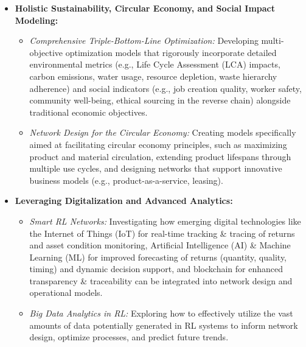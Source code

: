 \begin{itemize}
    \item \textbf{Holistic Sustainability, Circular Economy, and Social Impact Modeling:}
        \begin{itemize}
            \item \textit{Comprehensive Triple-Bottom-Line Optimization:} Developing multi-objective optimization models that rigorously incorporate detailed environmental metrics (e.g., Life Cycle Assessment (LCA) impacts, carbon emissions, water usage, resource depletion, waste hierarchy adherence) and social indicators (e.g., job creation quality, worker safety, community well-being, ethical sourcing in the reverse chain) alongside traditional economic objectives.
            \item \textit{Network Design for the Circular Economy:} Creating models specifically aimed at facilitating circular economy principles, such as maximizing product and material circulation, extending product lifespans through multiple use cycles, and designing networks that support innovative business models (e.g., product-as-a-service, leasing).
        \end{itemize}

    \item \textbf{Leveraging Digitalization and Advanced Analytics:}
        \begin{itemize}
            \item \textit{Smart RL Networks:} Investigating how emerging digital technologies like the Internet of Things (IoT) for real-time tracking \& tracing of returns and asset condition monitoring, Artificial Intelligence (AI) \& Machine Learning (ML) for improved forecasting of returns (quantity, quality, timing) and dynamic decision support, and blockchain for enhanced transparency \& traceability can be integrated into network design and operational models.
            \item \textit{Big Data Analytics in RL:} Exploring how to effectively utilize the vast amounts of data potentially generated in RL systems to inform network design, optimize processes, and predict future trends.
        \end{itemize}


\end{itemize}

